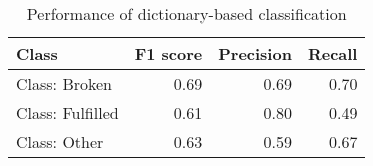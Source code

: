\begin{table}[ht]
\centering
\caption{Performance of dictionary-based classification} 
\label{tab:performance_classification}
\begingroup\footnotesize
\begin{tabular}{lrrr}
  \hline
Class & F1 score & Precision & Recall \\ 
  \hline
Class: Broken & 0.69 & 0.69 & 0.70 \\ 
  Class: Fulfilled & 0.61 & 0.80 & 0.49 \\ 
  Class: Other & 0.63 & 0.59 & 0.67 \\ 
   \hline
\end{tabular}
\endgroup
\end{table}
